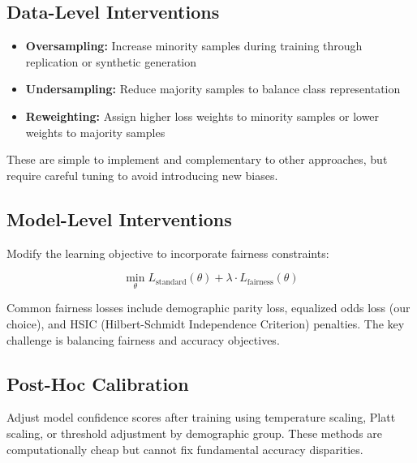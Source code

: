 \documentclass[11pt,a4paper,oneside]{report}
\begin{document}
\subsection{Data-Level Interventions}

\begin{itemize}

\item \textbf{Oversampling:} Increase minority samples during training through replication or synthetic generation

\item \textbf{Undersampling:} Reduce majority samples to balance class representation

\item \textbf{Reweighting:} Assign higher loss weights to minority samples or lower weights to majority samples

\end{itemize}

These are simple to implement and complementary to other approaches, but require careful tuning to avoid introducing new biases.

\subsection{Model-Level Interventions}

Modify the learning objective to incorporate fairness constraints:

\begin{equation}
\min_{\theta} L_{\text{standard}}(\theta) + \lambda \cdot L_{\text{fairness}}(\theta)
\end{equation}

Common fairness losses include demographic parity loss, equalized odds loss (our choice), and HSIC (Hilbert-Schmidt Independence Criterion) penalties. The key challenge is balancing fairness and accuracy objectives.

\subsection{Post-Hoc Calibration}

Adjust model confidence scores after training using temperature scaling, Platt scaling, or threshold adjustment by demographic group. These methods are computationally cheap but cannot fix fundamental accuracy disparities.

\end{document}
